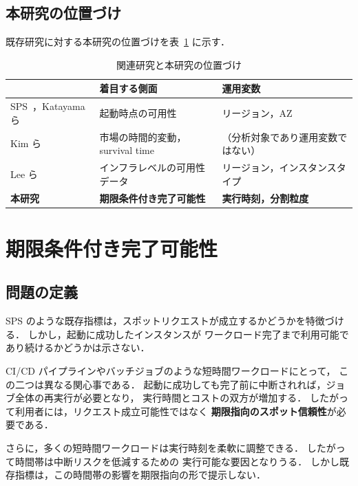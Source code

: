\documentclass[11pt,a4paper]{ltjsreport}
\begin{document}
\section{本研究の位置づけ}

既存研究に対する本研究の位置づけを表~\ref{tab:related} に示す．

\begin{table}[htbp]
\centering
\caption{関連研究と本研究の位置づけ}
\label{tab:related}
\small
\begin{tabularx}{\textwidth}{@{}lXX@{}}
\toprule
 & \textbf{着目する側面} & \textbf{運用変数} \\
\midrule
SPS~\cite{AWSSPS}，Katayama ら~\cite{Katayama2022}
  & 起動時点の可用性
  & リージョン，AZ \\
\addlinespace
Kim ら~\cite{Kim2024SpotInterruption}
  & 市場の時間的変動，survival time
  & （分析対象であり運用変数ではない） \\
\addlinespace
Lee ら~\cite{Lee2022SpotLake}
  & インフラレベルの可用性データ
  & リージョン，インスタンスタイプ \\
\addlinespace
\textbf{本研究}
  & \textbf{期限条件付き完了可能性}
  & \textbf{実行時刻，分割粒度} \\
\bottomrule
\end{tabularx}
\end{table}

\chapter{期限条件付き完了可能性}
\label{chap:fcomp}

\section{問題の定義}

SPS のような既存指標は，スポットリクエストが成立するかどうかを特徴づける．
しかし，起動に成功したインスタンスが
ワークロード完了まで利用可能であり続けるかどうかは示さない．

CI/CD パイプラインやバッチジョブのような短時間ワークロードにとって，
この二つは異なる関心事である．
起動に成功しても完了前に中断されれば，ジョブ全体の再実行が必要となり，
実行時間とコストの双方が増加する．
したがって利用者には，リクエスト成立可能性ではなく
\textbf{期限指向のスポット信頼性}が必要である．

さらに，多くの短時間ワークロードは実行時刻を柔軟に調整できる．
したがって時間帯は中断リスクを低減するための
実行可能な要因となりうる．
しかし既存指標は，この時間帯の影響を期限指向の形で提示しない．
\end{document}
